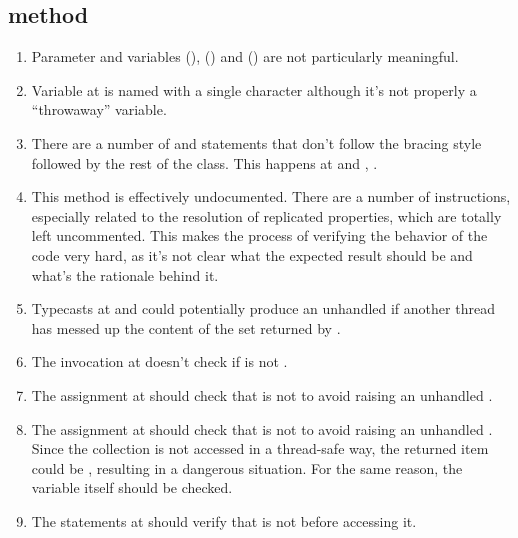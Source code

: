 \subsection{ method}
\begin{enumerate}
	\item {} Parameter  and variables  (),  () and  () are not particularly meaningful. 
	\item {} Variable  at  is named with a single character although it's not properly a “throwaway” variable. 
	\item {} There are a number of  and  statements that don't follow the bracing style followed by the rest of the class. This happens at  and , .
	\item {} This method is effectively undocumented. There are a number of instructions, especially related to the resolution of replicated properties, which are totally left uncommented. This makes the process of verifying the behavior of the code very hard, as it's not clear what the expected result should be and what's the rationale behind it. 
	\item {} Typecasts at  and  could potentially produce an unhandled  if another thread has messed up the content of the set returned by .
	\item {} The invocation  at  doesn't check if  is not .
	\item {} The assignment  at  should check that  is not  to avoid raising an unhandled . 
	\item {} The assignment  at  should check that  is not  to avoid raising an unhandled . Since the collection is not accessed in a thread-safe way, the returned item could be , resulting in a dangerous situation. For the same reason, the  variable itself should be checked. 
	\item {} The  statements at  should verify that  is not  before accessing it. 

\end{enumerate}

